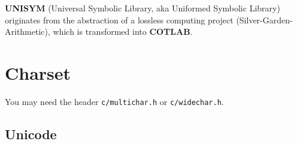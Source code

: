 

\textbf{UNISYM} (Universal Symbolic Library, aka Uniformed Symbolic Library) originates from the abstraction of a lossless computing project (Silver-Garden-Arithmetic), which is transformed into \textbf{COTLAB}.

\section{Charset}

You may need the header \verb|c/multichar.h| or \verb|c/widechar.h|.

\subsection{Unicode}


